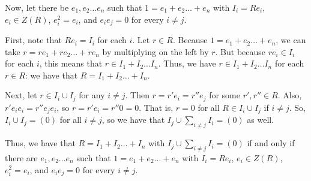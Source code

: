 \documentclass[a4paper,12pt]{article}
\newcommand{\tab}{\hspace{4mm}} %
\newcommand{\shunt}{\vspace{20mm}}
\begin{document}
Now, let there be $e_1, e_2 \ldots e_n$ such that $1 = e_1 + e_2 \ldots +e_n$ with $I_i = Re_i$, $e_i \in Z(R)$, $e_i^2 = e_i$, and $e_ie_j = 0$ for every $i \neq j$.

\tab First, note that $Re_i = I_i$ for each $i$. Let $r \in R$. Because $1 = e_1 + e_2 \ldots +e_n$, we can take $r =re_1 + re_2 \ldots + re_n$ by multiplying on the left by $r$. But because $re_i \in I_i$ for each $i$, this means that $r \in I_1 + I_2 \ldots I_n$. Thus, we have $r \in I_1 + I_2 \ldots I_n$ for each $r \in R$: we have that $R = I_1 + I_2 \ldots +I_n$.

\tab Next, let $r \in I_i \cup I_j$ for any $i \neq j$. Then $r = r'e_i=r''e_j$ for some $r',r'' \in R$. Also, $r'e_ie_i=r''e_je_i$, so $r=r'e_i = r''0=0$. That is, $r=0$ for all $R \in I_i \cup I_j$ if $i \neq j$. So, $I_i \cup I_j = (0)$ for all $i \neq j$, so we have that $I_j \cup \sum\limits_{i \neq j} I_i = (0)$ as well.

Thus, we have that $R = I_1 +I_2 \ldots + I_n$ with $I_j \cup \sum\limits_{i \neq j} I_i = (0)$ if and only if there are $e_1, e_2 \ldots e_n$ such that $1 = e_1 + e_2 \ldots +e_n$ with $I_i = Re_i$, $e_i \in Z(R)$, $e_i^2 = e_i$, and $e_ie_j = 0$ for every $i \neq j$.

\shunt
\end{document}
